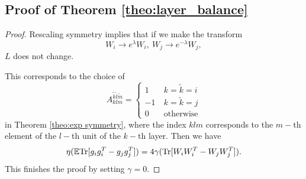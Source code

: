 \documentclass{article}
\theoremstyle{plain}
\newcommand{\E}{\mathbb{E}}
\newcommand{\Tr}{{\rm Tr}}
\begin{document}
\subsection{Proof of Theorem \ref{theo:layer_balance}}
\begin{proof}
    Rescaling symmetry implies that if we make the transform
    \begin{equation}
        W_i \to e^{\lambda}W_i,\ W_j \to e^{-\lambda}W_j,
    \end{equation}
    $L$ does not change.

    This corresponds to the choice of 
    \begin{equation}
        A_{klm}^{\tilde{k}\tilde{l}\tilde{m}}=\begin{cases}
1 & \ k=\tilde{k}=i \\
-1 & \ k=\tilde{k}=j\\
0&\ \text{otherwise}
\end{cases}
    \end{equation}in Theorem \ref{theo:exp symmetry}, where the index $klm$ corresponds to the $m-$th element of the $l-$th unit of the $k-$th layer. Then we have
    \begin{equation}
    \eta(\mathbb{E}\Tr[g_ig_i^T-g_jg_j^T])=4\gamma(\Tr[W_iW_i^T-W_jW_j^T]).
    \end{equation}
    This finishes the proof by setting $\gamma=0$.
\end{proof}
\end{document}
